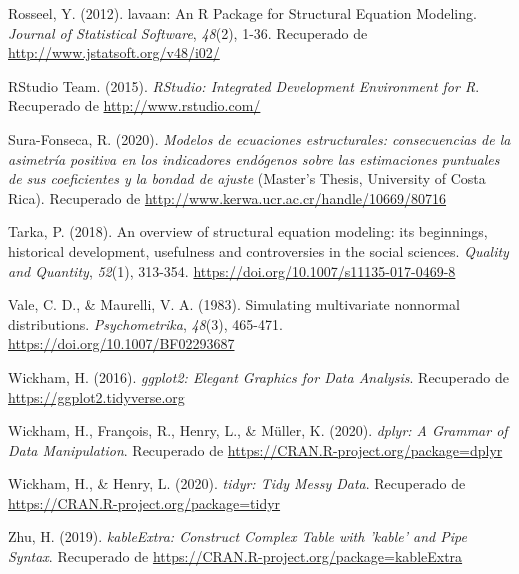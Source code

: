 \documentclass[
  english]{revcoles}
\begin{document}
\leavevmode\hypertarget{ref-lavaan}{}%
Rosseel, Y. (2012). lavaan: An R Package for Structural Equation
Modeling. \emph{Journal of Statistical Software}, \emph{48}(2), 1-36.
Recuperado de \url{http://www.jstatsoft.org/v48/i02/}

\leavevmode\hypertarget{ref-RStudio}{}%
RStudio Team. (2015). \emph{RStudio: Integrated Development Environment
for R}. Recuperado de \url{http://www.rstudio.com/}

\leavevmode\hypertarget{ref-SuraFonseca2020}{}%
Sura-Fonseca, R. (2020). \emph{Modelos de ecuaciones estructurales:
consecuencias de la asimetría positiva en los indicadores endógenos
sobre las estimaciones puntuales de sus coeficientes y la bondad de
ajuste} (Master's Thesis, University of Costa Rica). Recuperado de
\url{http://www.kerwa.ucr.ac.cr/handle/10669/80716}

\leavevmode\hypertarget{ref-Tarka2018}{}%
Tarka, P. (2018). An overview of structural equation modeling: its
beginnings, historical development, usefulness and controversies in the
social sciences. \emph{Quality and Quantity}, \emph{52}(1), 313-354.
\url{https://doi.org/10.1007/s11135-017-0469-8}

\leavevmode\hypertarget{ref-Vale1983}{}%
Vale, C. D., \& Maurelli, V. A. (1983). Simulating multivariate
nonnormal distributions. \emph{Psychometrika}, \emph{48}(3), 465-471.
\url{https://doi.org/10.1007/BF02293687}

\leavevmode\hypertarget{ref-ggplot2}{}%
Wickham, H. (2016). \emph{ggplot2: Elegant Graphics for Data Analysis}.
Recuperado de \url{https://ggplot2.tidyverse.org}

\leavevmode\hypertarget{ref-dplyr}{}%
Wickham, H., François, R., Henry, L., \& Müller, K. (2020). \emph{dplyr:
A Grammar of Data Manipulation}. Recuperado de
\url{https://CRAN.R-project.org/package=dplyr}

\leavevmode\hypertarget{ref-tidyr}{}%
Wickham, H., \& Henry, L. (2020). \emph{tidyr: Tidy Messy Data}.
Recuperado de \url{https://CRAN.R-project.org/package=tidyr}

\leavevmode\hypertarget{ref-kableExtra}{}%
Zhu, H. (2019). \emph{kableExtra: Construct Complex Table with 'kable'
and Pipe Syntax}. Recuperado de
\url{https://CRAN.R-project.org/package=kableExtra}
\end{document}
